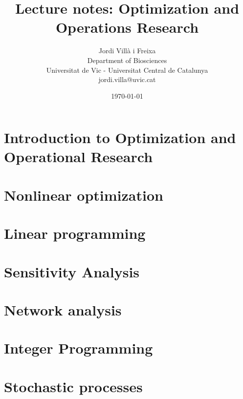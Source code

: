 \documentclass[10pt, a4paper, twoside]{book}
\title{Lecture notes: Optimization and Operations Research}
\author{Jordi Villà i Freixa\\Department of Biosciences\\Universitat de Vic - Universitat Central de Catalunya\\jordi.villa@uvic.cat}
\date{\today}
\begin{document}
\maketitle
\tableofcontents

\chapter{Introduction to Optimization and Operational Research}



\chapter{Nonlinear optimization}


\chapter{Linear programming}

%

\chapter{Sensitivity Analysis}


\chapter{Network analysis}


\chapter{Integer Programming}


\chapter{Stochastic processes}


\end{document}
